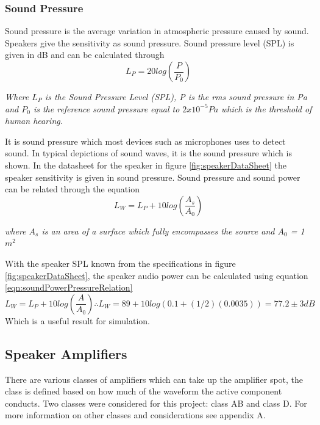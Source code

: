 \documentclass[12pt, a4paper]{article}
\begin{document}
\subsubsection{Sound Pressure}

Sound pressure is the average variation in atmospheric pressure caused by sound. Speakers give the sensitivity as sound pressure. Sound pressure level (SPL) is given in dB and can be calculated through \cite{soundTerminology}
\begin{equation}
	\label{eqn:SPL}
	L_P = 20log\left(\frac{P}{P_0}\right)
\end{equation}
\begin{center}
	\textit{Where $L_P$ is the Sound Pressure Level (SPL), P is the rms sound pressure in Pa and $P_0$ is the reference sound pressure equal to $2x10^{-5}Pa$ which is the threshold of human hearing.}
\end{center}
It is sound pressure which most devices such as microphones uses to detect sound. In typical depictions of sound waves, it is the sound pressure which is shown. In the datasheet for the speaker in figure \ref{fig:speakerDataSheet} the speaker sensitivity is given in sound pressure. Sound pressure and sound power can be related through the equation
\begin{equation}
	\label{eqn:soundPowerPressureRelation}
	L_W = L_P + 10log\left(\frac{A_s}{A_0}\right)
\end{equation}
\begin{center}
	\textit{where $A_s$ is an area of a surface which fully encompasses the source and $A_0$ = 1$m^2$}
\end{center}
With the speaker SPL known from the specifications in figure \ref{fig:speakerDataSheet}, the speaker audio power can be calculated using equation \ref{eqn:soundPowerPressureRelation}
\begin{equation}
	L_W = L_P + 10log\left(\frac{A}{A_0}\right) \therefore L_W = 89 + 10log\left(0.1 + (1/2)(0.0035)\right) = 77.2 \pm 3 dB
	\label{eqn:ourSpeakerPower}
\end{equation}
Which is a useful result for simulation. \\ 
\subsection{Speaker Amplifiers}
There are various classes of amplifiers which can take up the amplifier spot, the class is defined based on how much of the waveform the active component conducts. Two classes were considered for this project: class AB and class D. For more information on other classes and considerations see appendix A.\\
\end{document}
